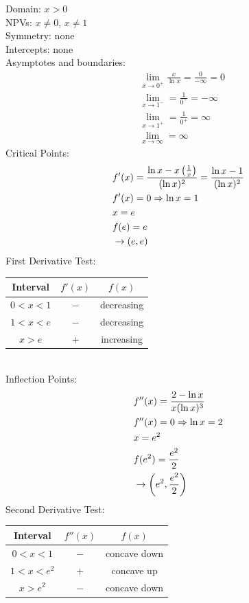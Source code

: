 \documentclass[11pt, fleqn]{article}
\begin{document}
Domain: $x>0$\\
NPVs: $x\neq 0$, $x\neq 1$\\
Symmetry: none\\
Intercepts: none\\
Asymptotes and boundaries:
\begin{align*}
    &\lim_{x\to 0^+}\frac{x}{\ln x}=\frac{0}{-\infty}=0\\
    &\lim_{x\to 1^-}=\frac{1}{0^-}=-\infty\\
    &\lim_{x\to 1^+}=\frac{1}{0^+}=\infty\\
    &\lim_{x\to \infty}=\infty
\end{align*}
Critical Points:
\begin{align*}
    &f'(x)=\frac{\ln x-x\left( \frac{1}{x} \right)}{(\ln x)^2}=\frac{\ln x-1}{(\ln x)^2}\\
    &f'(x)=0\Rightarrow \ln x=1\\
    &x=e\\
    &f(e)=e\\
    &\rightarrow (e,e)
\end{align*}
First Derivative Test:\\
\begin{tabular}{c||c|c}
    Interval & $f'(x)$ & $f(x)$\\
    \hline
    $0<x<1$ & $-$ & decreasing\\
    $1<x<e$ & $-$ & decreasing\\
    $x>e$ & $+$ & increasing
\end{tabular}\\
Inflection Points:
\begin{align*}
    &f''(x)=\frac{2-\ln x}{x(\ln x)^3}\\
    &f''(x)=0\Rightarrow \ln x=2\\
    &x=e^2\\
    &f(e^2)=\frac{e^2}{2}\\
    &\rightarrow \left( e^2,\frac{e^2}{2} \right)
\end{align*}
Second Derivative Test:\\
\begin{tabular}{c||c|c}
    Interval & $f''(x)$ & $f(x)$\\
    \hline
    $0<x<1$ & $-$ & concave down\\
    $1<x<e^2$ & $+$ & concave up\\
    $x>e^2$ & $-$ & concave down
\end{tabular}\\
\\
\end{document}
